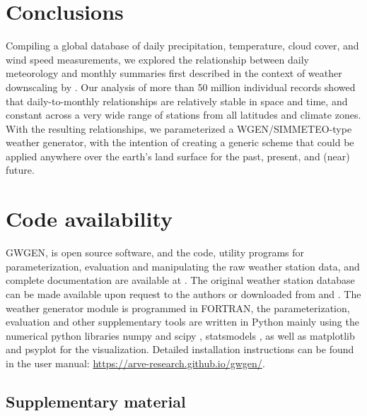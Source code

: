 \documentclass[
11pt, %
english, %
singlespacing, %
headsepline, %
]{MastersDoctoralThesis} %
\begin{document}
\begin{NoHyper}
\begin{refsection}
\section{Conclusions}
Compiling a global database of daily precipitation, temperature, cloud cover, and wind speed measurements, we explored the relationship between daily meteorology and monthly summaries first described in the context of weather downscaling by \cite{GengAuburn1987}. Our analysis of more than 50 million individual records showed that daily-to-monthly relationships are relatively stable in space and time, and constant across a very wide range of stations from all latitudes and climate zones. With the resulting relationships, we parameterized a WGEN/SIMMETEO-type weather generator, with the intention of creating a generic scheme that could be applied anywhere over the earth's land surface for the past, present, and (near) future. 

\section{Code availability} \label{sec:code}
GWGEN, is open source software, and the code, utility programs for parameterization, evaluation and manipulating the raw weather station data, and complete documentation are available at \citep{SommerKaplan2017a}. The original weather station database can be made available upon request to the authors or downloaded from \cite{HahnWarren1999} and \cite{MenneDurreVoseEtAl2012}. The weather generator module is programmed in FORTRAN, the parameterization, evaluation and other supplementary tools are written in Python mainly using the numerical python libraries numpy and scipy \citep{JonesOliphantPetersonEtAl2001}, statsmodels \citep{SeaboldPerktold2010}, as well as matplotlib \citep{Hunter2007} and psyplot \citep{Sommer2017} for the visualization. Detailed installation instructions can be found in the user manual: \url{https://arve-research.github.io/gwgen/}.

\clearpage

\begin{subappendices}
\section{Supplementary material}    %


\end{subappendices}
\end{refsection}
\end{NoHyper}
\end{document}
